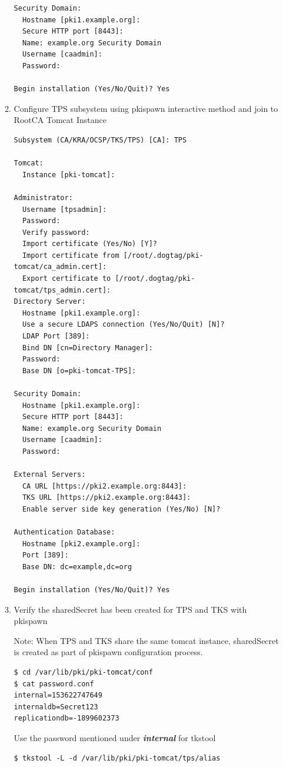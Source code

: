 \documentclass[a4paper]{article}
\begin{document}
\begin{enumerate}[label*=\arabic*.]
\begin{enumerate}[label*=\arabic*.]
\begin{lstlisting}
Security Domain:
  Hostname [pki1.example.org]:
  Secure HTTP port [8443]:
  Name: example.org Security Domain
  Username [caadmin]:
  Password:

Begin installation (Yes/No/Quit)? Yes
                    \end{lstlisting}
                \item \label {shared_tps} Configure TPS subsystem using pkispawn interactive method and join to RootCA Tomcat Instance
                    \begin{lstlisting}
Subsystem (CA/KRA/OCSP/TKS/TPS) [CA]: TPS

Tomcat:
  Instance [pki-tomcat]: 

Administrator:
  Username [tpsadmin]: 
  Password: 
  Verify password: 
  Import certificate (Yes/No) [Y]? 
  Import certificate from [/root/.dogtag/pki-tomcat/ca_admin.cert]: 
  Export certificate to [/root/.dogtag/pki-tomcat/tps_admin.cert]: 
Directory Server:
  Hostname [pki1.example.org]: 
  Use a secure LDAPS connection (Yes/No/Quit) [N]? 
  LDAP Port [389]: 
  Bind DN [cn=Directory Manager]: 
  Password: 
  Base DN [o=pki-tomcat-TPS]: 

Security Domain:
  Hostname [pki1.example.org]: 
  Secure HTTP port [8443]: 
  Name: example.org Security Domain
  Username [caadmin]: 
  Password: 

External Servers:
  CA URL [https://pki2.example.org:8443]: 
  TKS URL [https://pki2.example.org:8443]: 
  Enable server side key generation (Yes/No) [N]? 

Authentication Database:
  Hostname [pki2.example.org]: 
  Port [389]: 
  Base DN: dc=example,dc=org

Begin installation (Yes/No/Quit)? Yes
                    \end{lstlisting}
                \item \label{shared_tps_secret} Verify the sharedSecret has been created for TPS and TKS with pkispawn 

                    Note: When TPS and TKS share the same tomcat instance, sharedSecret is created
                    as part of pkispawn configuration process.
                    \begin{lstlisting}[style=bashInputStyle]
$ cd /var/lib/pki/pki-tomcat/conf
$ cat password.conf
internal=153622747649
internaldb=Secret123
replicationdb=-1899602373
                    \end{lstlisting}
                    Use the password mentioned under \textit{\textbf{internal}} for tkstool 
                    \begin{lstlisting}[style=bashInputStyle]
$ tkstool -L -d /var/lib/pki/pki-tomcat/tps/alias


\end{lstlisting}
\end{enumerate}
\end{enumerate}
\end{document}
